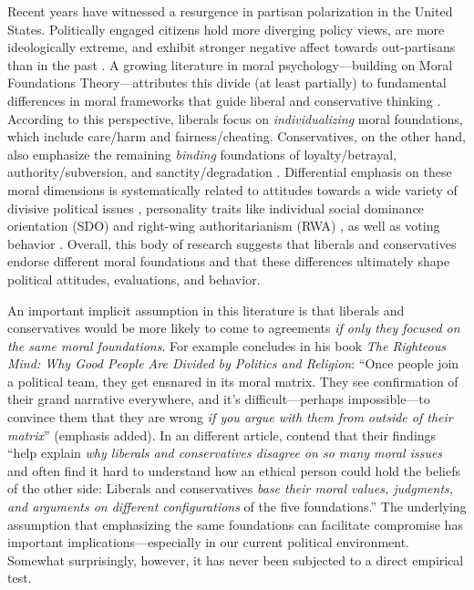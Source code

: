 Recent years have witnessed a resurgence in partisan polarization in the United States. Politically engaged citizens hold more diverging policy
views, are more ideologically extreme, and exhibit stronger negative affect towards out-partisans than in the past \citep{hetherington2001resurgent, abramowitz2008polarization, iyengar2012affect, mason2014disrespectfully, huddy2015expressive, iyengar2015fear}. A growing literature in moral psychology---building on Moral Foundations Theory---attributes this divide (at least partially) to fundamental differences in moral frameworks that guide liberal and conservative thinking \citep[c.f.,][]{haidt2012righteous}. According to this perspective, liberals focus on \emph{individualizing} moral foundations, which include care/harm and fairness/cheating. Conservatives, on the other hand, also emphasize the remaining \emph{binding} foundations of loyalty/betrayal, authority/subversion, and sanctity/degradation \citep{haidt2007morality, graham2009liberals}. Differential emphasis on these moral dimensions is systematically related to attitudes towards a wide variety of divisive political issues \citep[e.g.][]{koleva2012tracing, kertzer2014moral, low2015moral}, personality traits like individual social dominance orientation (SDO) and right-wing authoritarianism (RWA) \citep{federico2013mapping}, as well as voting behavior \citep{franks2015using}. Overall, this body of research suggests that liberals and conservatives endorse different moral foundations and that these differences ultimately shape political attitudes, evaluations, and behavior.

An important implicit assumption in this literature is that liberals and conservatives would be more likely to come to agreements \emph{if only they focused on the same moral foundations}. For example \citet[365]{haidt2012righteous} concludes in his book \emph{The Righteous Mind: Why Good People Are Divided by Politics and Religion}: ``Once people join a political team, they get ensnared in its moral matrix. They see confirmation of their grand
narrative everywhere, and it's difficult---perhaps impossible---to convince them that they are wrong \emph{if you argue with them from outside of their matrix}'' (emphasis added). In an different article, \citet[1040]{graham2009liberals} contend that their findings ``help explain \emph{why liberals and conservatives disagree on so many moral issues} and often find it hard to understand how an ethical person could hold the beliefs of the other side: Liberals and conservatives \emph{base their moral values, judgments, and arguments on different configurations} of the five foundations.'' The underlying assumption that emphasizing the same foundations can facilitate compromise has important implications---especially in our current political environment. Somewhat surprisingly, however, it has never been subjected to a direct empirical test.

